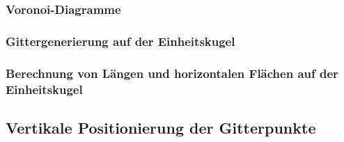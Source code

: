 \documentclass{book}
\begin{document}
\subsubsection{Voronoi-Diagramme}
\label{sec:voronoi-diagramme}

\subsubsection{Gittergenerierung auf der Einheitskugel}
\label{sec:gittergenerierung_auf_der_einheitskugel}

\subsubsection{Berechnung von Längen und horizontalen Flächen auf der Einheitskugel}
\label{sec:berechung_von_längen_und_horizontalen_flächen_auf_der_einheitskugel}

\subsection{Vertikale Positionierung der Gitterpunkte}
\label{sec:vertikale_positionierung_der_gitterpunkte}
\end{document}
